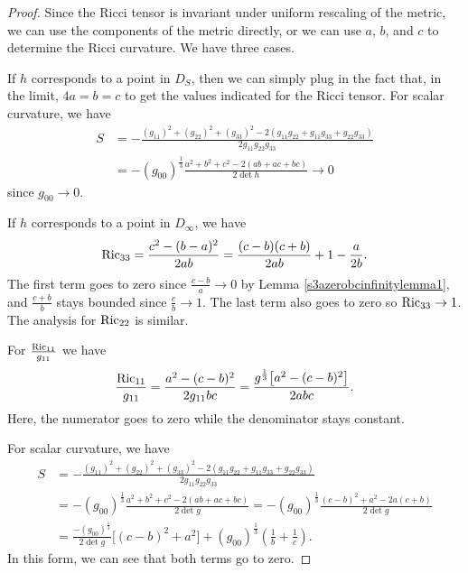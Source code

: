 \documentclass[10pt,a4paper]{amsart}
\numberwithin{equation}{section}
\begin{document}
\begin{proof}
Since the Ricci tensor is invariant under uniform rescaling of the metric, we can use the components of the metric directly, or we can use $a$, $b$, and $c$ to determine the Ricci curvature. We have three cases.

If $h$ corresponds to a point in $D_S$, then we can simply plug in the fact that, in the limit, $4a = b = c$ to get the values indicated for the Ricci tensor. For scalar curvature, we have{\samepage
\begin{align*}
S &= - \frac{(g_{11})^2 + (g_{22})^2+(g_{33})^2 - 2(g_{11} g_{22} + g_{11} g_{33} + g_{22} g_{33})}
			{2 g_{11} g_{22} g_{33}} \\
	&= -(g_{00})^{\frac{1}{3}} \frac{a^2 + b^2 + c^2 - 2(ab + ac + bc)}{2 \det h} \rightarrow 0
\end{align*}
since $g_{00} \rightarrow 0$.}

If $h$ corresponds to a point in $D_{\infty}$, we have
\begin{gather*}
{\rm Ric}_{33} = \frac{c^2 - (b-a)^2}{2ab}
		 = \frac{(c-b)(c+b)}{2ab} + 1 - \frac{a}{2b}.
\end{gather*}
The first term goes to zero since $\frac{c - b}{a} \rightarrow 0$ by Lemma \ref{s3azerobcinfinitylemma1}, and $\frac{c+b}{b}$ stays bounded since $\frac{c}{b} \rightarrow 1$. The last term also goes to zero so ${\rm Ric}_{33} \rightarrow 1$. The analysis for ${\rm Ric}_{22}$ is similar.

For $\frac{{\rm Ric}_{11}}{g_{11}}$ we have
\begin{equation*}
\frac{{\rm Ric}_{11}}{g_{11}} = \frac{a^2 - (c - b)^2}{2g_{11}bc}
				= \frac{g^{\frac{1}{3}}\big[a^2 - (c - b)^2\big]}{2abc}.
\end{equation*}
Here, the numerator goes to zero while the denominator stays constant.

For scalar curvature, we have
\begin{align*}
S &= - \frac{(g_{11})^2 + (g_{22})^2+(g_{33})^2 - 2(g_{11} g_{22} + g_{11} g_{33} + g_{22} g_{33})}
			{2 g_{11} g_{22} g_{33}} \\
	&= -(g_{00})^{\frac{1}{3}} \frac{a^2 + b^2 + c^2 - 2(ab + ac + bc)}{2 \det g}
	 = -(g_{00})^{\frac{1}{3}} \frac{(c - b)^2 + a^2 - 2a(c + b)}{2 \det g} \\
	&= \frac{-(g_{00})^{\frac{1}{3}}}{2 \det g}\big[(c-b)^2 + a^2\big]
		+ (g_{00})^{\frac{1}{3}} \left(\frac{1}{b} + \frac{1}{c} \right).
\end{align*}
In this form, we can see that both terms go to zero.


\end{proof}
\end{document}
